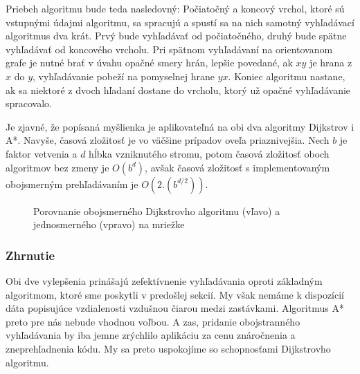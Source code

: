 Priebeh algoritmu bude teda nasledovný: Počiatočný a koncový vrchol, ktoré sú vstupnými údajmi algoritmu, sa spracujú a spustí sa na nich samotný vyhľadávací algoritmus dva krát. Prvý bude vyhľadávať od počiatočného, druhý bude spätne vyhľadávať od koncového vrcholu. Pri spätnom vyhľadávaní na orientovanom grafe je nutné brať v úvahu opačné smery hrán, lepšie povedané, ak $xy$ je hrana z $x$ do $y$, vyhľadávanie pobeží na pomyselnej hrane $yx$. Koniec algoritmu nastane, ak sa niektoré z dvoch hľadaní dostane do vrcholu, ktorý už opačné vyhľadávanie spracovalo.\newline

Je zjavné, že popísaná myšlienka je aplikovateľná na obi dva algoritmy \textendash Dijkstrov i A*. Navyše, časová zložitosť je vo väčšine prípadov oveľa priaznivejšia. Nech $b$ je faktor vetvenia a $d$ hĺbka vzniknutého stromu, potom časová zložitosť oboch algoritmov bez zmeny je $O(b^{d})$, avšak časová zložitosť s implementovaným obojsmerným prehľadávaním je $O(2.(b^{d/2}))$.\newline

\begin{figure}[H]
  \caption{Porovnanie obojsmerného Dijkstrovho algoritmu (vľavo) a jednosmerného (vpravo) na mriežke}
  \label{Bidiretional_Dijkstra}
\end{figure}


\subsubsection{Zhrnutie}

Obi dve vylepšenia prinášajú zefektívnenie vyhľadávania oproti základným algoritmom, ktoré sme poskytli v predošlej sekcií. My však nemáme k dispozícií dáta popisujúce vzdialenosti vzdušnou čiarou medzi zastávkami. Algoritmus A* preto pre nás nebude vhodnou voľbou. A zas, pridanie obojstranného vyhľadávania by iba jemne zrýchlilo aplikáciu za cenu znáročnenia a zneprehľadnenia kódu. My sa preto uspokojíme so schopnosťami Dijkstrovho algoritmu.\newline

